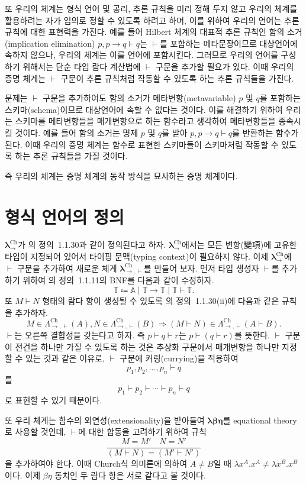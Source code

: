 \documentclass[10pt,twocolumn]{article}
\theoremstyle{definition}
\newcommand{\lch}{\bm\lambda_\to^{\text{Ch}}}
\newcommand{\lchh}{\bm\lambda_{\to,\vdash}^{\text{Ch}}}
\newcommand{\Lchh}{\Lambda_{\to,\vdash}^{\text{Ch}}}
\begin{document}
또 우리의 체계는 형식 언어 및 공리, 추론 규칙을 미리 정해 두지 않고 우리의 체계를 활용하려는 자가 임의로 정할 수 있도록 하려고 하며, 이를 위하여 우리의 언어는 추론 규칙에 대한 표현력을 가진다. 예를 들어 Hilbert 체계의 대표적 추론 규칙인 함의 소거(implication elimination) $p, p\to q\vdash q$는 $\vdash$를 포함하는 메타문장이므로 대상언어에 속하지 않으나, 우리의 체계는 이를 언어에 포함시킨다. 그러므로 우리의 언어를 구성하기 위해서는 단순 타입 람다 계산법에 $\vdash$ 구문을 추가할 필요가 있다. 이때 우리의 증명 체계는 $\vdash$ 구문이 추론 규칙처럼 작동할 수 있도록 하는 추론 규칙들을 가진다.

문제는 $\vdash$ 구문을 추가하여도 함의 소거가 메타변항(metavariable) $p$ 및 $q$를 포함하는 스키마(schema)이므로 대상언어에 속할 수 없다는 것이다. 이를 해결하기 위하여 우리는 스키마를 메타변항들을 매개변항으로 하는 함수라고 생각하여 메타변항들을 종속시킬 것이다. 예를 들어 함의 소거는 명제 $p$ 및 $q$를 받아 $p, p\to q\vdash q$를 반환하는 함수가 된다. 이때 우리의 증명 체계는 함수로 표현한 스키마들이 스키마처럼 작동할 수 있도록 하는 추론 규칙들을 가질 것이다.

즉 우리의 체계는 증명 체계의 동작 방식을 묘사하는 증명 체계이다.

\section{형식 언어의 정의}

$\lch$가 \cite{luswt}의 정의~1.1.30과 같이 정의된다고 하자. $\lch$에서는 모든 변항(變項)에 고유한 타입이 지정되어 있어서 타이핑 문맥(typing context)이 필요하지 않다. 이제 $\lch$에 $\vdash$ 구문을 추가하여 새로운 체계 $\lchh$를 만들어 보자. 먼저 타입 생성자 $\vdash$를 추가하기 위하여 \cite{luswt}의 정의~1.1.11의 BNF를 다음과 같이 수정하자.
$$\mathds T \Coloneqq \mathbb A\mid\mathds T\to\mathds T\mid\mathds T\vdash\mathds T.$$
또 $M\vdash N$ 형태의 람다 항이 생성될 수 있도록 \cite{luswt}의 정의~1.1.30(ii)에 다음과 같은 규칙을 추가하자.
$$M\in\Lchh(A), N\in\Lchh(B)\Rightarrow (M\vdash N)\in\Lchh(A\vdash B).$$
$\vdash$는 오른쪽 결합성을 갖는다고 하자. 즉 $p\vdash q\vdash r$는 $p\vdash (q\vdash r)$를 뜻한다. $\vdash$ 구문이 전건을 하나만 가질 수 있도록 하는 것은 추상화 구문에서 매개변항을 하나만 지정할 수 있는 것과 같은 이유로, $\vdash$ 구문에 커링(currying)을 적용하여
$$p_1, p_2, \ldots, p_n\vdash q$$
를
$$p_1 \vdash p_2\vdash\cdots\vdash p_n\vdash q$$
로 표현할 수 있기 때문이다.

또 우리 체계는 함수의 외연성(extensionality)을 받아들여 $\bm{\lambda\beta\eta}$를 equational theory로 사용할 것인데, $\vdash$에 대한 합동을 고려하기 위하여 규칙
$$\dfrac{M=M'\quad N=N'}{(M\vdash N)=(M'\vdash N')}$$
을 추가하여야 한다. 이때 Church식 의미론에 의하여 $A\ne B$일 때 $\lambda x^A.x^A\ne\lambda x^B.x^B$이다. 이제 $\beta\eta$ 동치인 두 람다 항은 서로 같다고 볼 것이다.
\end{document}
